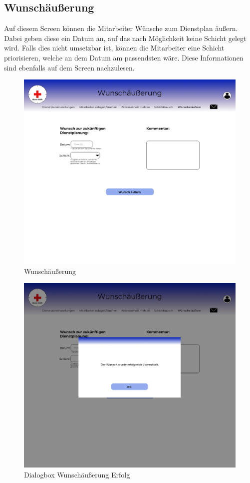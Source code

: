 \documentclass[11pt,
paper=a4,
bibtotocnumbered,	  %
liststotocnumbered,  %
DIV=calc,		  %
tablecaptionabove,	  %
headinclude,
]{article}
\begin{document}
\subsection{Wunschäußerung}
Auf diesem Screen können die Mitarbeiter Wünsche zum Dienstplan äußern. Dabei geben diese ein Datum an, auf das nach Möglichkeit keine Schicht gelegt wird. Falls dies nicht umsetzbar ist, können die Mitarbeiter eine Schicht priorisieren, welche an dem Datum am passendsten wäre. Diese Informationen sind ebenfalls auf dem Screen nachzulesen.
\begin{figure}[H]
\includegraphics[width=1\textwidth]{Bilder/Screens/Wunschaeusserung.jpg}{\centering}
\caption{Wunschäußerung}
\end{figure}
\begin{figure}[H]
\includegraphics[width=1\textwidth]{Bilder/Screens/Wunschaeusserung-1.jpg}{\centering}
\caption{Dialogbox Wunschäußerung Erfolg}
\end{figure}
\end{document}
